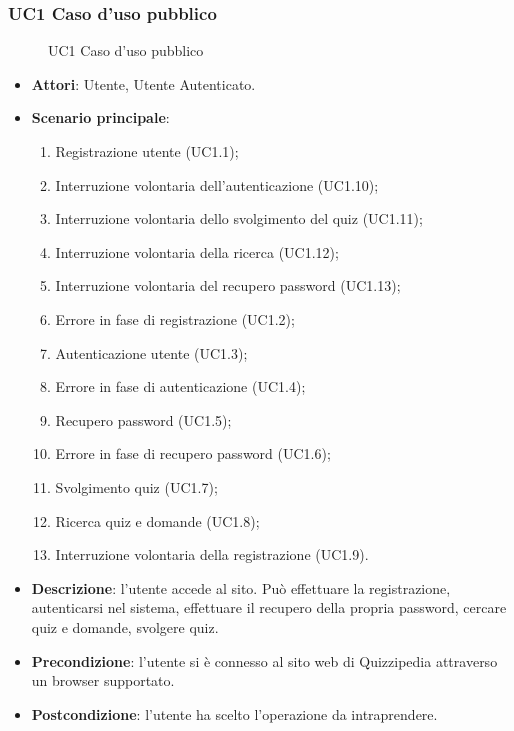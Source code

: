 \subsubsection{UC1 Caso d'uso pubblico}
\begin{figure}[H]
\centering
\noindent{}
\caption{UC1 Caso d'uso pubblico}
\end{figure}
\begin{itemize}
\item \textbf{Attori}: Utente, Utente Autenticato.
\item \textbf{Scenario principale}:
\begin{enumerate}
\item Registrazione utente (UC1.1);
\item Interruzione volontaria dell'autenticazione (UC1.10);
\item Interruzione volontaria dello svolgimento del quiz (UC1.11);
\item Interruzione volontaria della ricerca (UC1.12);
\item Interruzione volontaria del recupero password (UC1.13);
\item Errore in fase di registrazione (UC1.2);
\item Autenticazione utente (UC1.3);
\item Errore in fase di autenticazione (UC1.4);
\item Recupero password (UC1.5);
\item Errore in fase di recupero password (UC1.6);
\item Svolgimento quiz (UC1.7);
\item Ricerca quiz e domande (UC1.8);
\item Interruzione volontaria della registrazione (UC1.9).
\end{enumerate}
\item \textbf{Descrizione}: l'utente accede al sito. Può effettuare la registrazione, autenticarsi nel sistema, effettuare il recupero della propria password, cercare quiz e domande, svolgere quiz.
\item \textbf{Precondizione}: l'utente si è connesso al sito web di Quizzipedia attraverso un browser supportato.
\item \textbf{Postcondizione}: l'utente ha scelto l'operazione da intraprendere.
\end{itemize}
